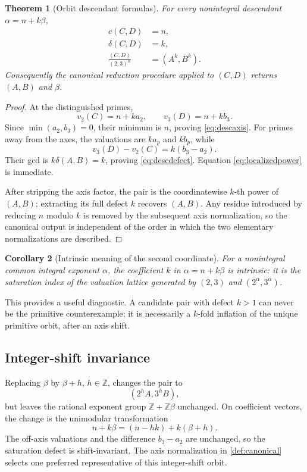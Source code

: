 \documentclass[11pt]{article}
\numberwithin{equation}{section}
\newtheorem{theorem}{Theorem}[section]
\newtheorem{corollary}[theorem]{Corollary}
\theoremstyle{definition}
\newcommand{\Z}{\mathbb{Z}}
\newcommand{\defect}{\delta}
\begin{document}
\begin{theorem}[Orbit descendant formulas]\label{thm:descendant}
For every nonintegral descendant \(\alpha=n+k\beta\),
\begin{align}
  c(C,D)&=n,\label{eq:descaxis}\\
  \defect(C,D)&=k,\label{eq:descdefect}\\
  \frac{(C,D)}{(2,3)^n}&=(A^k,B^k).\label{eq:localizedpower}
\end{align}
Consequently the canonical reduction procedure applied to \((C,D)\) returns \((A,B)\) and \(\beta\).
\end{theorem}

\begin{proof}
At the distinguished primes,
\[
 v_2(C)=n+k a_2,
 \qquad
 v_3(D)=n+k b_3.
\]
Since \(\min(a_2,b_3)=0\), their minimum is \(n\), proving \eqref{eq:descaxis}. For primes away from the axes, the valuations are \(k a_p\) and \(k b_p\), while
\[
 v_3(D)-v_2(C)=k(b_3-a_2).
\]
Their gcd is \(k\defect(A,B)=k\), proving \eqref{eq:descdefect}. Equation \eqref{eq:localizedpower} is immediate.

After stripping the axis factor, the pair is the coordinatewise \(k\)-th power of \((A,B)\); extracting its full defect \(k\) recovers \((A,B)\). Any residue introduced by reducing \(n\) modulo \(k\) is removed by the subsequent axis normalization, so the canonical output is independent of the order in which the two elementary normalizations are described.
\end{proof}

\begin{corollary}[Intrinsic meaning of the second coordinate]\label{cor:kintrinsic}
For a nonintegral common integral exponent \(\alpha\), the coefficient \(k\) in \(\alpha=n+k\beta\) is intrinsic: it is the saturation index of the valuation lattice generated by \((2,3)\) and \((2^\alpha,3^\alpha)\).
\end{corollary}

This provides a useful diagnostic. A candidate pair with defect \(k>1\) can never be the primitive counterexample; it is necessarily a \(k\)-fold inflation of the unique primitive orbit, after an axis shift.

\subsection{Integer-shift invariance}

Replacing \(\beta\) by \(\beta+h\), \(h\in\Z\), changes the pair to
\[
       (2^hA,3^hB),
\]
but leaves the rational exponent group \(\Z+\Z\beta\) unchanged. On coefficient vectors, the change is the unimodular transformation
\[
       n+k\beta=(n-hk)+k(\beta+h).
\]
The off-axis valuations and the difference \(b_3-a_2\) are unchanged, so the saturation defect is shift-invariant. The axis normalization in \cref{def:canonical} selects one preferred representative of this integer-shift orbit.
\end{document}
